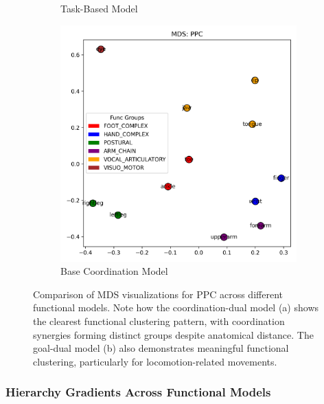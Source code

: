 \documentclass{article}
\begin{document}
\begin{figure}[!htbp]
\begin{subfigure}[b]{0.45\textwidth}
        \caption{Task-Based Model}
        \label{fig:mds_task}
    \end{subfigure}
    \hfill
    \begin{subfigure}[b]{0.45\textwidth}
        \centering
        \includegraphics[width=\textwidth]{results/coordination/mds_PPC.png}
        \caption{Base Coordination Model}
        \label{fig:mds_coord}
    \end{subfigure}
    \caption{Comparison of MDS visualizations for PPC across different functional models. Note how the coordination-dual model (a) shows the clearest functional clustering pattern, with coordination synergies forming distinct groups despite anatomical distance. The goal-dual model (b) also demonstrates meaningful functional clustering, particularly for locomotion-related movements.}
    \label{fig:mds_comparison_models}
\end{figure}

\subsubsection{Hierarchy Gradients Across Functional Models}
\end{document}
